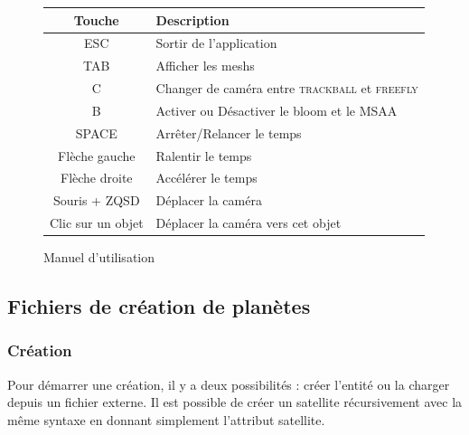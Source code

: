 \documentclass[11pt,a4paper]{article}
\begin{document}
\def\arraystretch{1.5}
\begin{figure}[h!]
\centering
\begin{tabular}{c|l}
    \hline
	\textbf{Touche} & \textbf{Description} \\ \hline
   	ESC		& Sortir de l'application \\ \hline
   	TAB		& Afficher les meshs \\ \hline
   	C		& Changer de caméra entre \textsc{trackball} et \textsc{freefly} \\ \hline
   	B		& Activer ou Désactiver le bloom et le MSAA \\ \hline
   	SPACE		& Arrêter/Relancer le temps\\ \hline
   	Flèche gauche	& Ralentir le temps \\ \hline
   	Flèche droite 	& Accélérer le temps \\ \hline
   	Souris + ZQSD	& Déplacer la caméra \\ \hline
   	Clic sur un objet & Déplacer la caméra vers cet objet \\ \hline
\end{tabular}
\caption{Manuel d'utilisation}
\end{figure}

\subsection{Fichiers de création de planètes}

\subsubsection{Création}

Pour démarrer une création, il y a deux possibilités : créer l'entité ou la charger depuis un fichier externe. Il est possible de créer un satellite récursivement avec la même syntaxe en donnant simplement l'attribut satellite.
\end{document}
